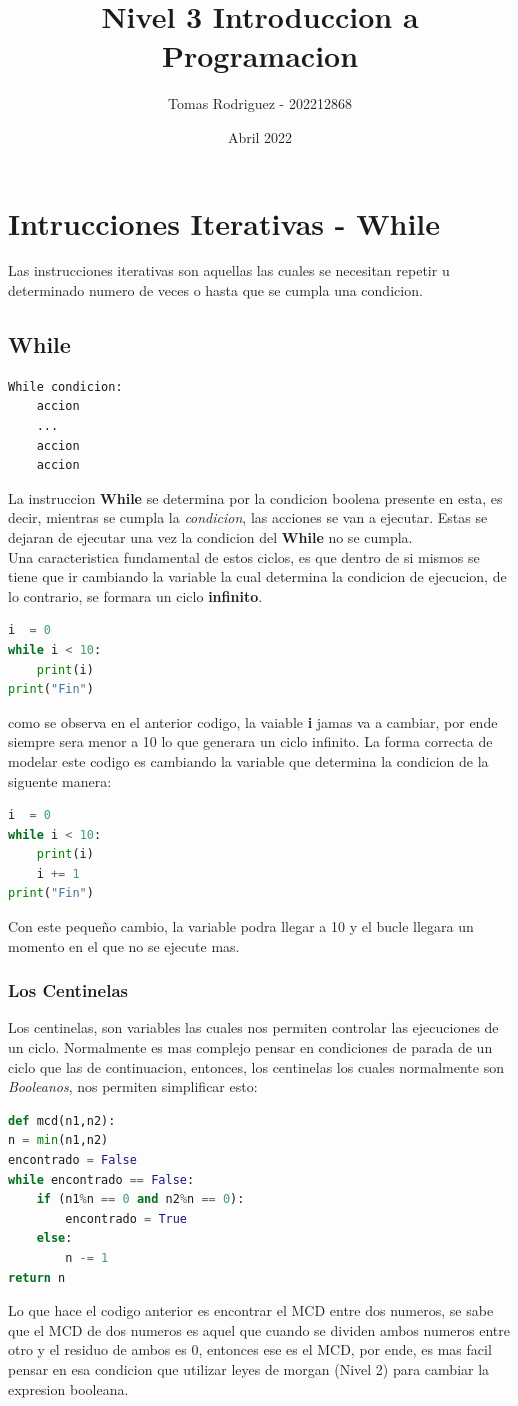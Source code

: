 \documentclass{article}
\title{Nivel 3 Introduccion a Programacion}
\author{Tomas Rodriguez - 202212868}
\date{Abril 2022}
\begin{document}
\maketitle
\section{Intrucciones Iterativas - While}
Las instrucciones iterativas son aquellas las cuales se necesitan repetir u determinado numero de veces o hasta que se cumpla una condicion. 
\subsection{While}
\begin{lstlisting}[language=Python, caption=Ciclo While]
While condicion: 
    accion
    ...
    accion 
    accion
\end{lstlisting}
La instruccion \textbf{While} se determina por la condicion boolena presente en esta, es decir, mientras se cumpla la \textit{condicion}, las acciones se van a ejecutar. Estas se dejaran de ejecutar una vez la condicion del \textbf{While} no se cumpla.\\
Una caracteristica fundamental de estos ciclos, es que dentro de si mismos se tiene que ir cambiando la variable la cual determina la condicion de ejecucion, de lo contrario, se formara un ciclo \textbf{infinito}.
\begin{lstlisting}[language=Python, caption= While infinito]
i  = 0
while i < 10:
    print(i)
print("Fin")
\end{lstlisting}
como se observa en el anterior codigo, la vaiable \textbf{i} jamas va a cambiar, por ende siempre sera menor a 10 lo que generara un ciclo infinito. La forma correcta de modelar este codigo es cambiando la variable que determina la condicion de la siguente manera:
\begin{lstlisting}[language=Python, caption=While Finito ]
i  = 0
while i < 10:
    print(i)
    i += 1
print("Fin")
\end{lstlisting}
Con este pequeño cambio, la variable podra llegar a 10 y el bucle llegara un momento en el que no se ejecute mas. 
\subsubsection{Los Centinelas}
Los centinelas, son variables las cuales nos permiten controlar las ejecuciones de un ciclo. Normalmente es mas complejo pensar en condiciones de parada de un ciclo que las de continuacion, entonces, los centinelas los cuales normalmente son \textit{Booleanos}, nos permiten simplificar esto:
\begin{lstlisting}[language=Python, caption=While Finito ]
def mcd(n1,n2):
n = min(n1,n2)
encontrado = False
while encontrado == False:
    if (n1%n == 0 and n2%n == 0):
        encontrado = True
    else:
        n -= 1
return n
\end{lstlisting}
Lo que hace el codigo anterior es encontrar el MCD entre dos numeros, se sabe que el MCD de dos numeros es aquel que cuando se dividen ambos numeros entre otro y el residuo de ambos es 0, entonces ese es el MCD, por ende, es mas facil pensar en esa condicion que utilizar leyes de morgan (Nivel 2) para cambiar la expresion booleana. 
\end{document}
